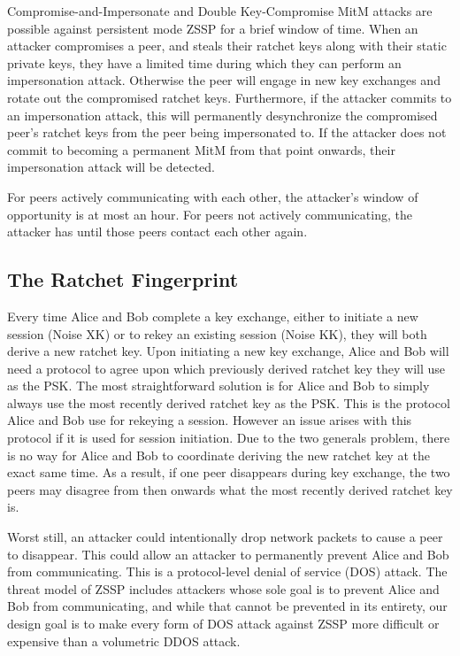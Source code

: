 \documentclass{article}
\begin{document}
Compromise-and-Impersonate and Double Key-Compromise MitM attacks are possible against persistent mode ZSSP for a brief window of time. When an attacker compromises a peer, and steals their ratchet keys along with their static private keys, they have a limited time during which they can perform an impersonation attack. Otherwise the peer will engage in new key exchanges and rotate out the compromised ratchet keys. Furthermore, if the attacker commits to an impersonation attack, this will permanently desynchronize the compromised peer's ratchet keys from the peer being impersonated to. If the attacker does not commit to becoming a permanent MitM from that point onwards, their impersonation attack will be detected.

For peers actively communicating with each other, the attacker's window of opportunity is at most an hour. For peers not actively communicating, the attacker has until those peers contact each other again.

\subsection{The Ratchet Fingerprint}

Every time Alice and Bob complete a key exchange, either to initiate a new session (Noise XK) or to rekey an existing session (Noise KK), they will both derive a new ratchet key. Upon initiating a new key exchange, Alice and Bob will need a protocol to agree upon which previously derived ratchet key they will use as the PSK. The most straightforward solution is for Alice and Bob to simply always use the most recently derived ratchet key as the PSK. This is the protocol Alice and Bob use for rekeying a session. However an issue arises with this protocol if it is used for session initiation. Due to the two generals problem, there is no way for Alice and Bob to coordinate deriving the new ratchet key at the exact same time. As a result, if one peer disappears during key exchange, the two peers may disagree from then onwards what the most recently derived ratchet key is.

Worst still, an attacker could intentionally drop network packets to cause a peer to disappear. This could allow an attacker to permanently prevent Alice and Bob from communicating. This is a protocol-level denial of service (DOS) attack. The threat model of ZSSP includes attackers whose sole goal is to prevent Alice and Bob from communicating, and while that cannot be prevented in its entirety, our design goal is to make every form of DOS attack against ZSSP more difficult or expensive than a volumetric DDOS attack.
\end{document}
